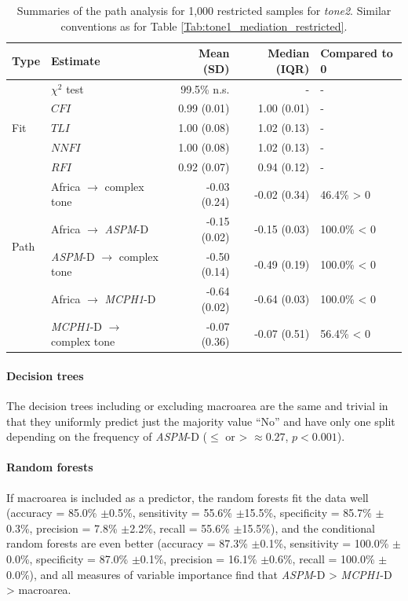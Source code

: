 \documentclass[twoside,onecolumn]{article}
\begin{document}
\begin{table}[h]
  \caption{Summaries of the path analysis for 1,000 restricted samples for \textit{tone2}. Similar conventions as for Table \ref{Tab:tone1_mediation_restricted}.}
  \label{Tab:tone2_path_restricted}
  \centering
  \begin{tabular}{|l|l|r|r|l|}
    \toprule
    \textbf{Type} & \textbf{Estimate} & \textbf{Mean (SD)} & \textbf{Median (IQR)} & \textbf{Compared to 0} \\
    \midrule
    \multirow{5}{*}{Fit} & $\chi^2$ test & 99.5\% n.s. & - & - \\
    & $CFI$  & 0.99 (0.01) & 1.00 (0.01) & - \\
    & $TLI$  & 1.00 (0.08) & 1.02 (0.13) & - \\
    & $NNFI$ & 1.00 (0.08) & 1.02 (0.13) & - \\
    & $RFI$  & 0.92 (0.07) & 0.94 (0.12) & - \\
    \midrule
    \multirow{4}{*}{Path} & Africa $\rightarrow$ complex tone & -0.03 (0.24) & -0.02 (0.34) & 46.4\% > 0 \\
    & Africa $\rightarrow$ \textit{ASPM}-D  & -0.15 (0.02) & -0.15 (0.03) & 100.0\% < 0 \\
    & \textit{ASPM}-D  $\rightarrow$ complex tone & -0.50 (0.14) & -0.49 (0.19) & 100.0\% < 0 \\
    & Africa $\rightarrow$ \textit{MCPH1}-D & -0.64 (0.02) & -0.64 (0.03) & 100.0\% < 0 \\
    & \textit{MCPH1}-D $\rightarrow$ complex tone &  -0.07 (0.36) &  -0.07 (0.51) & 56.4\% < 0 \\
    \bottomrule
  \end{tabular}
\end{table}


\paragraph{Decision trees}

The decision trees including or excluding macroarea are the same and trivial in that they uniformly predict just the majority value ``No'' and have only one split depending on the frequency of \textit{ASPM}-D ($\leq$ or > $\approx 0.27$, $p < 0.001$).


\paragraph{Random forests}

If macroarea is included as a predictor, the random forests fit the data well (accuracy = 85.0\% $\pm$0.5\%, sensitivity = 55.6\% $\pm$15.5\%, specificity = 85.7\% $\pm$0.3\%, precision = 7.8\% $\pm$2.2\%, recall = 55.6\% $\pm$15.5\%), and the conditional random forests are even better (accuracy = 87.3\% $\pm$0.1\%, sensitivity = 100.0\% $\pm$0.0\%, specificity = 87.0\% $\pm$0.1\%, precision = 16.1\% $\pm$0.6\%, recall = 100.0\% $\pm$0.0\%), and all measures of variable importance find that \textit{ASPM}-D > \textit{MCPH1}-D > macroarea.
\end{document}
